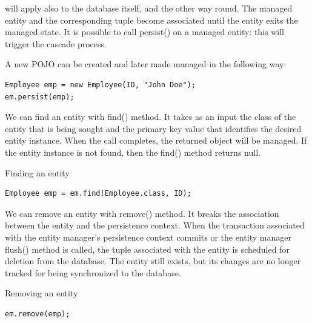 \documentclass[12pt, a4paper]{report}
\begin{document}
    will apply also to the database itself, and the other way round. The managed entity and the corresponding tuple become associated until the entity exits the managed state. It is 
    possible to call persist() on a managed entity: this will trigger the cascade process. 
    \begin{example}
        A new POJO can be created and later made managed in the following way: 
        \begin{lstlisting}[style=Java]
Employee emp = new Employee(ID, "John Doe"); 
em.persist(emp);
        \end{lstlisting}
    \end{example}
    We can find an entity with find() method. It  takes as an input the class of the entity that is being sought and the primary key value that identifies the desired 
    entity instance. When the call completes, the returned object will be managed. If the entity instance is not found, then the find() method returns null. 
    \begin{example}
        Finding an entity
        \begin{lstlisting}[style=Java]
Employee emp = em.find(Employee.class, ID);
        \end{lstlisting}
    \end{example}
    We can remove an entity with remove() method. It breaks the association between the entity and the persistence context. When the transaction associated with the 
    entity manager's persistence context commits or the entity manager flush() method is called, the tuple associated with the entity is scheduled for deletion from
    the database. The entity still exists, but its changes are no longer tracked for being synchronized to the database.
    \begin{example}
        Removing an entity
        \begin{lstlisting}[style=Java]
em.remove(emp);
        \end{lstlisting}
    \end{example}
\end{document}
